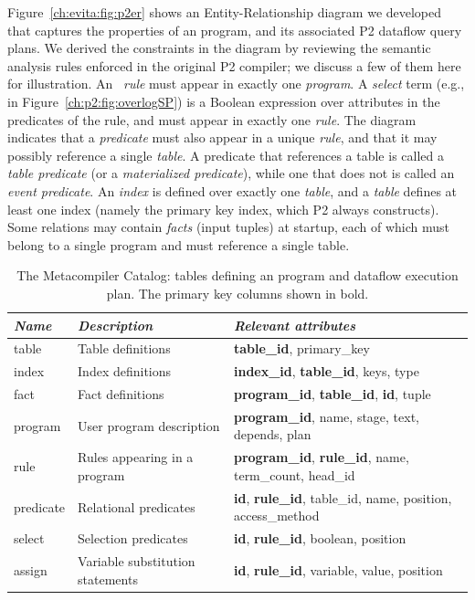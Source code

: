 Figure~\ref{ch:evita:fig:p2er} shows an Entity-Relationship diagram we developed that captures the 
properties of an \OVERLOG program, and its associated P2 dataflow query plans. 
We derived the constraints in the diagram by reviewing the semantic analysis rules enforced 
in the original P2 compiler; we discuss a few of them here for illustration.
An \OVERLOG~{\em rule} must appear in exactly one {\em program}. A {\em select} term 
(e.g.,  in Figure~\ref{ch:p2:fig:overlogSP}) is a Boolean expression 
over attributes in the predicates of the rule, and must appear in exactly one {\em rule}.  
The diagram indicates that a {\em predicate} must also appear in a unique {\em rule}, and 
that it may possibly reference a single {\em table}. A predicate that references a table is called 
a {\em table predicate} (or a \emph{materialized predicate}), while one that does not is called 
an {\em event predicate}. An {\em index} is defined over exactly one {\em table}, and a {\em table} 
defines at least one index (namely the primary key index, which P2 always
constructs). Some relations may contain {\em facts} (input tuples) at startup, 
each of which must belong to a single program and must reference a single table.

\begin{table}
\small{
\begin{tabular}{|l|l|l|} \hline
{\it Name}& {\it Description} & {\it Relevant attributes} \\ \hline\hline
table     & Table definitions & {\bf table\_id}, primary\_key\\ \hline
index     & Index definitions & {\bf index\_id}, {\bf table\_id}, keys, type \\ \hline
fact      & Fact definitions  & {\bf program\_id}, {\bf table\_id}, {\bf id}, tuple\\ \hline
program   & User program description     & {\bf program\_id}, name, stage, text, depends, plan \\ \hline
rule      & Rules appearing in a program   & {\bf program\_id}, {\bf rule\_id}, name,  term\_count, head\_id \\ \hline
predicate & Relational predicates  & {\bf id}, {\bf rule\_id}, table\_id, name, position, access\_method \\ \hline
select    & Selection predicates  & {\bf id}, {\bf rule\_id}, boolean, position \\  \hline
assign    & Variable substitution statements & {\bf id}, {\bf rule\_id}, variable, value, position \\ \hline 
\end{tabular}
}
\ssp
\caption{The Metacompiler Catalog: tables defining an \OVERLOG program and dataflow execution plan.
                The primary key columns shown in bold. }
\label{tbl:catalog}
\end{table}

